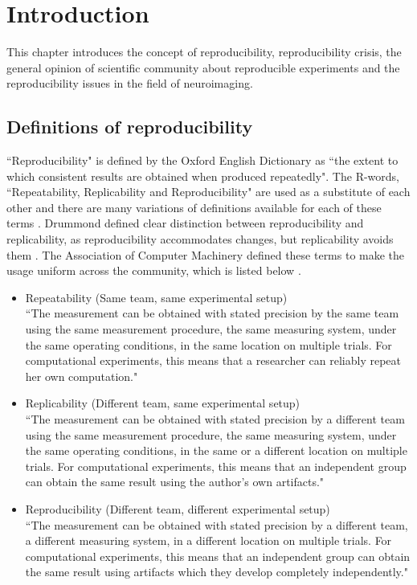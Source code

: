\chapter{Introduction}
This chapter introduces the concept of reproducibility, reproducibility crisis, the general opinion of scientific community about reproducible experiments and the reproducibility issues in the field of neuroimaging. 

\section{Definitions of reproducibility}

``Reproducibility" is defined by the Oxford English Dictionary as ``the extent to which consistent results are obtained when produced repeatedly". The R-words, ``Repeatability, Replicability and Reproducibility" are used as a substitute of each other and there are many variations of definitions available for each of these terms \cite{Plesser2018}. Drummond defined clear distinction between reproducibility and replicability, as reproducibility accommodates changes, but replicability avoids them \cite{Drummond}. The Association of Computer Machinery defined these terms to make the usage uniform across the community, which is listed below \cite{ACM2016}.

\begin{itemize}
\item {Repeatability (Same team, same experimental setup)\\}
      ``The measurement can be obtained with stated precision by the same team using the same measurement procedure, the same measuring system, under the same operating conditions, in the same location on multiple trials. For computational experiments, this means that a researcher can reliably repeat her own computation."
\item{Replicability (Different team, same experimental setup)\\}
      ``The measurement can be obtained with stated precision by a different team using the same measurement procedure, the same measuring system, under the same operating conditions, in the same or a different location on multiple trials. For computational experiments, this means that an independent group can obtain the same result using the author's own artifacts."
\item{Reproducibility (Different team, different experimental setup)\\}
      ``The measurement can be obtained with stated precision by a different team, a different measuring system, in a different location on multiple trials. For computational experiments, this means that an independent group can obtain the same result using artifacts which they develop completely independently."
\end{itemize}

